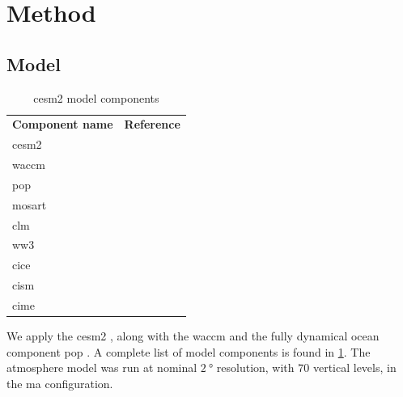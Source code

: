 \documentclass{ametsocV5}
\begin{document}
\section{Method}

\subsection{Model}

\begin{table}
  \centering

  \caption{\acl*{cesm2} model components}\label{tab:cesm-components}%
  \begin{center}
    \begin{tabular}[c]{ll}
      \multicolumn{1}{c}{\textbf{Component name}} &
      \multicolumn{1}{c}{\textbf{Reference}}                                              \\
      \acl*{cesm2}                                & \citet{danabasoglu2020}               \\
      \acl*{waccm}                                & \citet{gettleman2019}                 \\
      \acl*{pop}                                  & \citet{smith2010, danabasoglu2020}    \\
      \acl*{mosart}                               & \citet{li2013, danabasoglu2020}       \\
      \acl*{clm}                                  & \citet{lawrence2019, danabasoglu2020} \\
      \acl*{ww3}                                  & \citet{danabasoglu2020}               \\
      \acl*{cice}                                 & \citet{danabasoglu2020}               \\
      \acl*{cism}                                 & \citet{danabasoglu2020}               \\
      \acl*{cime}                                 & \citet{danabasoglu2020}
    \end{tabular}
  \end{center}
\end{table}

We apply the \ac{cesm2} \citep{danabasoglu2020}, along with the \ac{waccm}
\citep{gettleman2019} and the fully dynamical ocean component \ac{pop} \citep{smith2010,
  danabasoglu2020}. A complete list of model components is found in
\cref{tab:cesm-components}. The atmosphere model was run at nominal \(\SI{2}{\degree}\)
resolution, with \(70\) vertical levels, in the \ac{ma} configuration.
\end{document}
